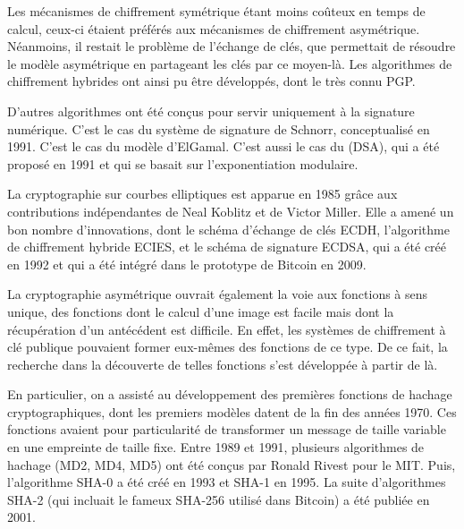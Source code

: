Les mécanismes de chiffrement symétrique étant moins coûteux en temps de calcul, ceux-ci étaient préférés aux mécanismes de chiffrement asymétrique. Néanmoins, il restait le problème de l'échange de clés, que permettait de résoudre le modèle asymétrique en partageant les clés par ce moyen-là. Les algorithmes de chiffrement hybrides ont ainsi pu être développés, dont le très connu PGP.

D'autres algorithmes ont été conçus pour servir uniquement à la signature numérique. C'est le cas du système de signature de Schnorr, conceptualisé en 1991. C'est le cas du modèle d'ElGamal. C'est aussi le cas du  (DSA), qui a été proposé en 1991 et qui se basait sur l'exponentiation modulaire.

La cryptographie sur courbes elliptiques est apparue en 1985 grâce aux contributions indépendantes de Neal Koblitz et de Victor Miller. Elle a amené un bon nombre d'innovations, dont le schéma d'échange de clés ECDH, l'algorithme de chiffrement hybride ECIES, et le schéma de signature ECDSA, qui a été créé en 1992 et qui a été intégré dans le prototype de Bitcoin en 2009.


La cryptographie asymétrique ouvrait également la voie aux fonctions à sens unique, des fonctions dont le calcul d'une image est facile mais dont la récupération d'un antécédent est difficile. En effet, les systèmes de chiffrement à clé publique pouvaient former eux-mêmes des fonctions de ce type. De ce fait, la recherche dans la découverte de telles fonctions s'est développée à partir de là.

En particulier, on a assisté au développement des premières fonctions de hachage cryptographiques, dont les premiers modèles datent de la fin des années 1970. Ces fonctions avaient pour particularité de transformer un message de taille variable en une empreinte de taille fixe. Entre 1989 et 1991, plusieurs algorithmes de hachage (MD2, MD4, MD5) ont été conçus par Ronald Rivest pour le MIT. Puis, l'algorithme SHA-0 a été créé en 1993 et SHA-1 en 1995. La suite d'algorithmes SHA-2 (qui incluait le fameux SHA-256 utilisé dans Bitcoin) a été publiée en 2001.

